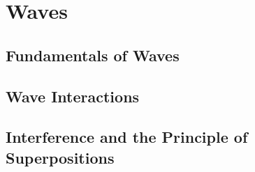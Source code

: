 \chapter{Waves}
	\section{Fundamentals of Waves}
	\section{Wave Interactions}
	\section{Interference and the Principle of Superpositions}
	

	


